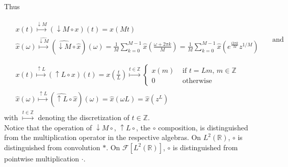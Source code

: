 \documentclass[twoside]{amsart}
\theoremstyle{plain}
\theoremstyle{definition}
\theoremstyle{remark}
\numberwithin{equation}{section}
\begin{document}

Thus

\begin{equation}
\boxed{
\begin{gathered}
  \begin{aligned}
& x(t) \overset{ \downarrow M}{ \mapsto } (\downarrow M \circ x)(t) = x(Mt) \\ 
& \widehat{x}(\omega) \overset{ \widehat{ \downarrow M} }{ \mapsto } ( \widehat{ \downarrow M } \circ \widehat{x})(\omega) = \frac{1}{M} \sum_{k=0}^{M-1} \widehat{x}\left( \frac{ \omega + 2\pi k}{M} \right) = \frac{1}{M} \sum_{k=0}^{M-1} \widehat{x}(e^{ \frac{i 2\pi k}{M} } z^{1/M} ) \\ 
\end{aligned} \quad \, \text{ and } \\
\begin{aligned}
  & x(t) \overset{ \uparrow L}{ \mapsto } (\uparrow L \circ x)(t) = x\left( \frac{t}{L} \right) \overset{ t\in \mathbb{Z}}{\mapsto } \begin{cases} x(m) & \text{ if } t = Lm, \, m \in\mathbb{Z} \\ 
    0 & \text{ otherwise } \end{cases} \\ 
    & \widehat{x}(\omega) \overset{ \widehat{ \uparrow L }}{ \mapsto } (\widehat{ \uparrow L } \circ \widehat{x} )(\omega) = \widehat{x}(\omega L) = \widehat{x}(z^L)
\end{aligned}
\end{gathered}
}
\end{equation}
with $\overset{t\in \mathbb{Z}}{ \mapsto }$ denoting the discretization of $t \in \mathbb{Z}$.  \\
Notice that the operation of $\downarrow M \circ$, $\uparrow L\circ$, the $\circ $ composition, is distinguished from the multiplication operator in the respective algebras.  On $L^2(\mathbb{R})$, $\circ$ is distinguished from convolution $*$.  On $\mathcal{F}[L^2(\mathbb{R})]$, $\circ$ is distinguished from pointwise multiplication $\cdot$.  
\end{document}

